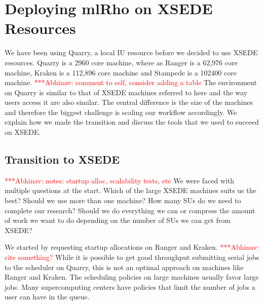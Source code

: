 \documentclass{sig-alternate}
\newcommand{\abhi}[1]{ {\textcolor{red} { ***Abhinav: #1 }}}
\newcommand{\abhi}[1]{ {}}
\begin{document}
%
%
%
%

\section{Deploying mlRho on XSEDE \\Resources}\label{sec:resources}
We have been using Quarry, a local IU resource before we decided to use XSEDE resources. Quarry is a 2960 core machine, where as Ranger is 	a 62,976 core machine, Kraken is a 112,896 core machine and Stampede is a 102400 core machine. \abhi{comment to self, consider adding a table}  The environment on Quarry is similar to that of XSEDE machines referred to here and the way users access it are also similar. The central difference is the size of the machines and therefore the biggest challenge is scaling our workflow accordingly. We explain how we made the transition and discuss the tools that we used to succeed on XSEDE.

\subsection{Transition to XSEDE}
\abhi{notes: startup alloc, scalability tests, etc}
We were faced with multiple questions at the start. Which of the large XSEDE machines suits us the best? Should we use more than one machine? How many SUs do we need to complete our research? Should we do everything we can or compress the amount of work we want to do depending on the number of SUs we can get from XSEDE?

We started by requesting startup allocations on Ranger and Kraken.  \abhi{cite something?} While it is possible to get good throughput submitting serial jobs to the scheduler on Quarry, this is not an optimal approach on machines like Ranger and Kraken. The scheduling policies on large machines usually favor large jobs. Many supercomputing centers have policies that limit the number of jobs a user can have in the queue. 
\end{document}
